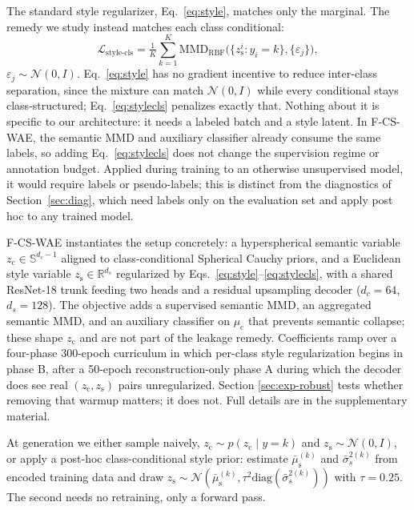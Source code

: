 \documentclass[letterpaper]{article} %
\newcommand{\ours}{F-CS-WAE}
\newcommand{\zc}{z_{\mathrm{c}}}
\newcommand{\zs}{z_{\mathrm{s}}}
\newcommand{\muc}{\mu_{\mathrm{c}}}
\newcommand{\mus}{\mu_{\mathrm{s}}}
\newcommand{\R}{\mathbb{R}}
\newcommand{\MMD}{\mathrm{MMD}}
\begin{document}
The standard style regularizer, Eq.~\ref{eq:style}, matches only the
marginal. The remedy we study instead matches each class conditional:
\begin{equation}
\mathcal L_{\text{style-cls}} = \tfrac1K\textstyle\sum_{k=1}^{K}
\MMD_{\mathrm{RBF}}\bigl(\{\zs^i:y_i{=}k\},\{\varepsilon_j\}\bigr),
\label{eq:stylecls}
\end{equation}
$\varepsilon_j\sim\mathcal N(0,I)$. Eq.~\ref{eq:style} has no gradient
incentive to reduce inter-class separation, since the mixture can match
$\mathcal N(0,I)$ while every conditional stays class-structured;
Eq.~\ref{eq:stylecls} penalizes exactly that. Nothing about it is specific to
our architecture: it needs a labeled batch and a style latent. In \ours{},
the semantic MMD and auxiliary classifier already consume the same labels,
so adding Eq.~\ref{eq:stylecls} does not change the supervision regime or
annotation budget. Applied during training to an otherwise unsupervised
model, it would require labels or pseudo-labels; this is distinct from the
diagnostics of Section~\ref{sec:diag}, which need labels only on the
evaluation set and apply post hoc to any trained model.

\ours{} instantiates the setup concretely: a hyperspherical semantic variable
$\zc\in\mathbb S^{d_c-1}$ aligned to class-conditional Spherical Cauchy
priors, and a Euclidean style variable $\zs\in\R^{d_s}$ regularized by
Eqs.~\ref{eq:style}--\ref{eq:stylecls}, with a shared ResNet-18 trunk feeding
two heads and a residual upsampling decoder ($d_c{=}64$, $d_s{=}128$). The
objective adds a supervised semantic MMD, an aggregated semantic MMD, and an
auxiliary classifier on $\muc$ that prevents semantic collapse; these shape
$\zc$ and are not part of the leakage remedy. Coefficients ramp over a
four-phase 300-epoch curriculum in which per-class style regularization
begins in phase B, after a 50-epoch reconstruction-only phase A during which
the decoder does see real $(\zc,\zs)$ pairs unregularized. Section
\ref{sec:exp-robust} tests whether removing that warmup matters; it does not.
Full details are in the supplementary material.

At generation we either sample naively, $\zc\sim p(\zc\mid y{=}k)$ and
$\zs\sim\mathcal N(0,I)$, or apply a post-hoc class-conditional style prior:
estimate $\bar\mus^{(k)}$ and $\bar\sigma_s^{2(k)}$ from encoded training
data and draw $\zs\sim\mathcal N(\bar\mus^{(k)},\tau^2\mathrm{diag}(\bar\sigma_s^{2(k)}))$
with $\tau{=}0.25$. The second needs no retraining, only a forward pass.
\end{document}
